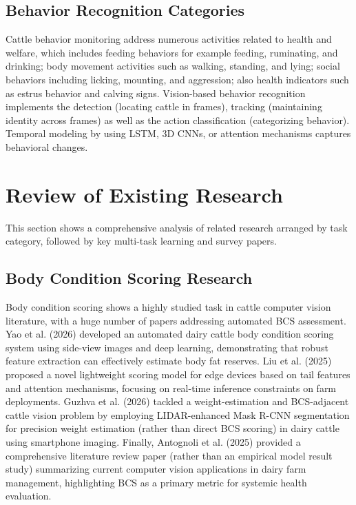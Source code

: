 \subsection{Behavior Recognition Categories}

Cattle behavior monitoring address numerous activities related to health and welfare, which includes feeding behaviors for example feeding, ruminating, and drinking; body movement activities such as walking, standing, and lying; social behaviors including licking, mounting, and aggression; also health indicators such as estrus behavior and calving signs. Vision-based behavior recognition implements the detection (locating cattle in frames), tracking (maintaining identity across frames) as well as the action classification (categorizing behavior). Temporal modeling by using LSTM, 3D CNNs, or attention mechanisms captures behavioral changes.



\section{Review of Existing Research}

This section shows a comprehensive analysis of related research arranged by task category, followed by key multi-task learning and survey papers.

\subsection{Body Condition Scoring Research}

Body condition scoring shows a highly studied task in cattle computer vision literature, with a huge number of papers addressing automated BCS assessment. Yao et al. (2026) \cite{yao2026jds2} developed an automated dairy cattle body condition scoring system using side-view images and deep learning, demonstrating that robust feature extraction can effectively estimate body fat reserves. Liu et al. (2025) \cite{liu2025vets} proposed a novel lightweight scoring model for edge devices based on tail features and attention mechanisms, focusing on real-time inference constraints on farm deployments. Guzhva et al. (2026) \cite{guzhva2026s415} tackled a weight-estimation and BCS-adjacent cattle vision problem by employing LIDAR-enhanced Mask R-CNN segmentation for precision weight estimation (rather than direct BCS scoring) in dairy cattle using smartphone imaging. Finally, Antognoli et al. (2025) \cite{antognoli2025ani1} provided a comprehensive literature review paper (rather than an empirical model result study) summarizing current computer vision applications in dairy farm management, highlighting BCS as a primary metric for systemic health evaluation.

